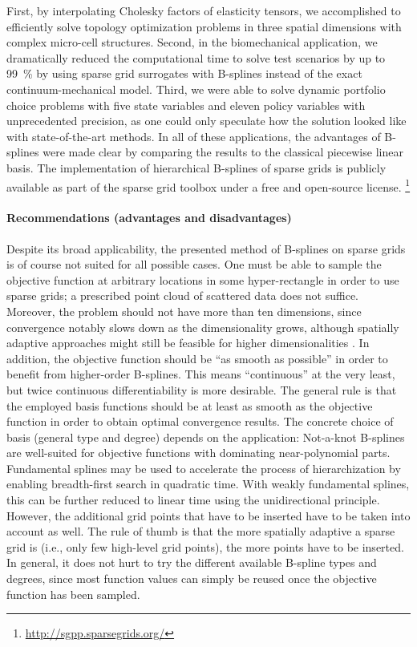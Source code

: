 First, by interpolating Cholesky factors of elasticity tensors,
we accomplished to efficiently solve
topology optimization problems in three spatial dimensions
with complex micro-cell structures.
Second, in the biomechanical application,
we dramatically reduced the computational time to solve
test scenarios by up to \SI{99}{\percent} by using
sparse grid surrogates with B-splines instead of the
exact continuum-mechanical model.
Third, we were able to solve dynamic portfolio choice problems
with five state variables and eleven policy variables
with unprecedented precision, as one could only speculate
how the solution looked like with state-of-the-art methods.
In all of these applications, the advantages of B-splines were made clear
by comparing the results to the classical piecewise linear basis.
The implementation of hierarchical B-splines of sparse grids is
publicly available as part of the sparse grid toolbox \sgpp
under a free and open-source license.%
\footnote{%
  \url{http://sgpp.sparsegrids.org/}%
}

\vspace*{\fill}
\pagebreak

\paragraph{Recommendations (advantages and disadvantages)}

Despite its broad applicability,
the presented method of B-splines on sparse grids is of course
not suited for all possible cases.
One must be able to sample the objective function at arbitrary
locations in some hyper-rectangle in order to use sparse grids;
a prescribed point cloud of scattered data does not suffice.
Moreover, the problem should not have more than ten dimensions,
since convergence notably slows down as the dimensionality grows,
although spatially adaptive approaches might still be feasible for
higher dimensionalities \cite{Pflueger10Spatially}.
In addition, the objective function should be ``as smooth as possible''
in order to benefit from higher-order B-splines.
This means ``continuous'' at the very least,
but twice continuous differentiability is more desirable.
The general rule is that the employed basis functions should be
at least as smooth as the objective function in order to obtain
optimal convergence results.
The concrete choice of basis (general type and degree) depends
on the application:
Not-a-knot B-splines are well-suited for objective functions with
dominating near-polynomial parts.
Fundamental splines may be used to accelerate the process of
hierarchization by enabling breadth-first search in quadratic time.
With weakly fundamental splines, this can be further reduced to
linear time using the unidirectional principle.
However, the additional grid points that have to be inserted
have to be taken into account as well.
The rule of thumb is that the more spatially adaptive a sparse grid is
(i.e., only few high-level grid points),
the more points have to be inserted.
In general, it does not hurt to try the different available
B-spline types and degrees,
since most function values can simply be reused
once the objective function has been sampled.

